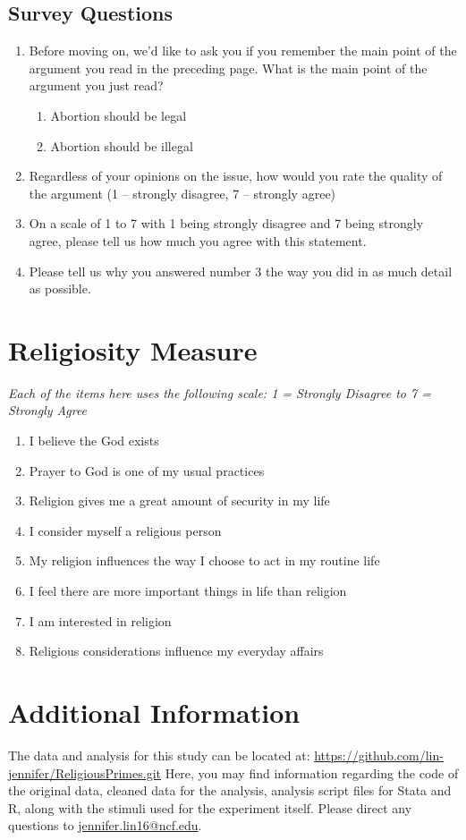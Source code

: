 \documentclass[12pt, titlepage]{article}
\newcommand\e{\emph}
\begin{document}
\subsection*{Survey Questions}
\begin{enumerate}
	\item Before moving on, we’d like to ask you if you remember the main point of the argument you read in the preceding page. What is the main point of the argument you just read?
	\begin{enumerate}
		\item Abortion should be legal
		\item	Abortion should be illegal
	\end{enumerate}
	 
	\item	Regardless of your opinions on the issue, how would you rate the quality of the argument (1 – strongly disagree, 7 – strongly agree) 
	\item	On a scale of 1 to 7 with 1 being strongly disagree and 7 being strongly agree, please tell us how much you agree with this statement.
	\item Please tell us why you answered number 3 the way you did in as much detail as possible.
\end{enumerate}

\section*{Religiosity Measure}

\begin{center}
	\e{Each of the items here uses the following scale: 1 = Strongly Disagree to 7 = Strongly Agree}
\end{center}

\begin{enumerate}
	\item I believe the God exists
	\item Prayer to God is one of my usual practices
	\item Religion gives me a great amount of security in my life
	\item I consider myself a religious person
	\item My religion influences the way I choose to act in my routine life
	\item I feel there are more important things in life than religion
	\item I am interested in religion 
	\item Religious considerations influence my everyday affairs
\end{enumerate}

\section*{Additional Information}

The data and analysis for this study can be located at: \url{https://github.com/lin-jennifer/ReligiousPrimes.git} Here, you may find information regarding the code of the original data, cleaned data for the analysis, analysis script files for Stata and R, along with the stimuli used for the experiment itself. Please direct any questions to \href{mailto:jennifer.lin16@ncf.edu}{jennifer.lin16@ncf.edu}.
\end{document}

